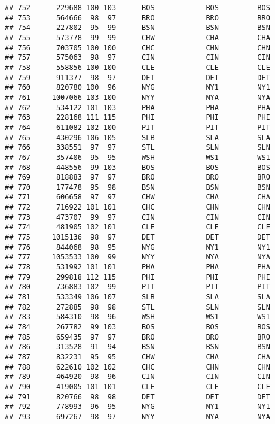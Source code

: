 \documentclass[]{article}
\begin{document}
\begin{verbatim}
## 752      229688 100 103      BOS            BOS         BOS
## 753      564666  98  97      BRO            BRO         BRO
## 754      227802  95  99      BSN            BSN         BSN
## 755      573778  99  99      CHW            CHA         CHA
## 756      703705 100 100      CHC            CHN         CHN
## 757      575063  98  97      CIN            CIN         CIN
## 758      558856 100 100      CLE            CLE         CLE
## 759      911377  98  97      DET            DET         DET
## 760      820780 100  96      NYG            NY1         NY1
## 761     1007066 103 100      NYY            NYA         NYA
## 762      534122 101 103      PHA            PHA         PHA
## 763      228168 111 115      PHI            PHI         PHI
## 764      611082 102 100      PIT            PIT         PIT
## 765      430296 106 105      SLB            SLA         SLA
## 766      338551  97  97      STL            SLN         SLN
## 767      357406  95  95      WSH            WS1         WS1
## 768      448556  99 103      BOS            BOS         BOS
## 769      818883  97  97      BRO            BRO         BRO
## 770      177478  95  98      BSN            BSN         BSN
## 771      606658  97  97      CHW            CHA         CHA
## 772      716922 101 101      CHC            CHN         CHN
## 773      473707  99  97      CIN            CIN         CIN
## 774      481905 102 101      CLE            CLE         CLE
## 775     1015136  98  97      DET            DET         DET
## 776      844068  98  95      NYG            NY1         NY1
## 777     1053533 100  99      NYY            NYA         NYA
## 778      531992 101 101      PHA            PHA         PHA
## 779      299818 112 115      PHI            PHI         PHI
## 780      736883 102  99      PIT            PIT         PIT
## 781      533349 106 107      SLB            SLA         SLA
## 782      272885  98  98      STL            SLN         SLN
## 783      584310  98  96      WSH            WS1         WS1
## 784      267782  99 103      BOS            BOS         BOS
## 785      659435  97  97      BRO            BRO         BRO
## 786      313528  91  94      BSN            BSN         BSN
## 787      832231  95  95      CHW            CHA         CHA
## 788      622610 102 102      CHC            CHN         CHN
## 789      464920  98  96      CIN            CIN         CIN
## 790      419005 101 101      CLE            CLE         CLE
## 791      820766  98  98      DET            DET         DET
## 792      778993  96  95      NYG            NY1         NY1
## 793      697267  98  97      NYY            NYA         NYA

\end{verbatim}
\end{document}
